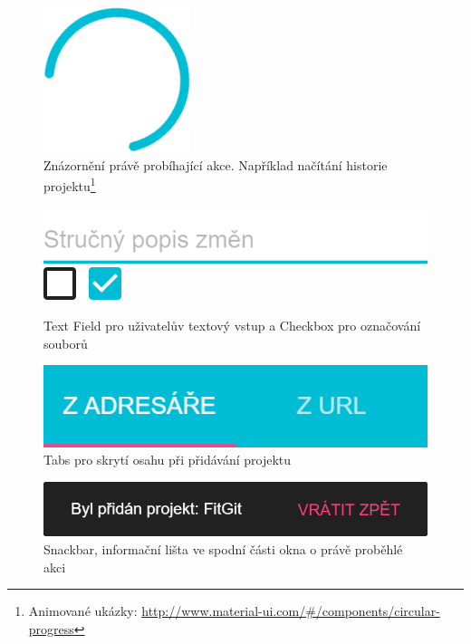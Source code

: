 \begin{figure}[ht]
	\centering
	\includegraphics[scale=0.5]{sections/ui/images/Progress.png}
	\caption[Progress]{Znázornění právě probíhající akce. Například načítání historie projektu\footnote{Animované ukázky: \url{http://www.material-ui.com/\#/components/circular-progress}}}
	\label{fig:progress}
\end{figure}

\begin{figure}[ht]
	\mbox{\includegraphics[scale=0.5]{sections/ui/images/TextField.png}}   
	\hspace{12px}
	\mbox{\includegraphics[scale=0.5]{sections/ui/images/Checkbox.png}}
	\caption[TextField a Checkbox]{Text Field pro uživatelův textový vstup a Checkbox pro označování souborů}
	\label{fig:form}
\end{figure}

\begin{figure}[ht]
	\centering
	\includegraphics[scale=0.5]{sections/ui/images/Tabs.png}
	\caption[Tabs]{Tabs pro skrytí osahu při přidávání projektu}
	\label{fig:tabs}
\end{figure}

\begin{figure}[ht]
	\centering
	\includegraphics[scale=0.5]{sections/ui/images/Snackbar.png}
	\caption[Snackbar]{Snackbar, informační lišta ve spodní části okna o právě proběhlé akci}
	\label{fig:snackbar}
\end{figure}

\FloatBarrier
